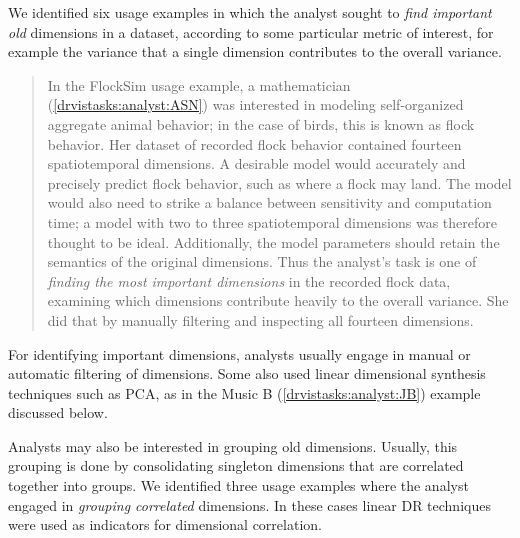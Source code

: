 We identified six usage examples in which the analyst sought to {\it find important old} dimensions in a dataset, according to some particular metric of interest, for example the variance that a single dimension contributes to the overall variance.

\begin{quotation}
    In the {\sc FlockSim} usage example, a mathematician (\ref{drvistasks:analyst:ASN}) was interested in modeling self-organized aggregate animal behavior; in the case of birds, this is known as flock behavior. 
    Her dataset of recorded flock behavior contained fourteen spatiotemporal dimensions.
    A desirable model would accurately and precisely predict flock behavior, such as where a flock may land. 
    The model would also need to strike a balance between sensitivity and computation time; a model with two to three spatiotemporal dimensions was therefore thought to be ideal.
    Additionally, the model parameters should retain the semantics of the original dimensions. 
    Thus the analyst's task is one of {\it finding the most important dimensions} in the recorded flock data, examining which dimensions contribute heavily to the overall variance. 
    She did that by manually filtering and inspecting all fourteen dimensions. 
\end{quotation}

For identifying important dimensions, analysts usually engage in manual or automatic filtering of dimensions. Some also used linear dimensional synthesis techniques such as \ac{PCA}, as in the {\sc Music B} (\ref{drvistasks:analyst:JB}) example discussed below.

Analysts may also be interested in grouping old dimensions. 
Usually, this grouping is done by consolidating singleton dimensions that are correlated together into groups.
We identified three usage examples where the analyst engaged in {\it grouping correlated} dimensions. 
In these cases linear \ac{DR} techniques were used as indicators for dimensional correlation.

